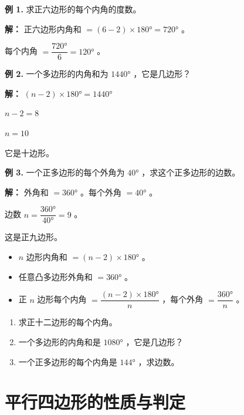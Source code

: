 \begin{workedexamples}


\textbf{例 1.} 求正六边形的每个内角的度数。

\textbf{解：}
正六边形内角和 $= (6 - 2) \times 180° = 720°$ 。

每个内角 $= \dfrac{720°}{6} = 120°$ 。

\textbf{例 2.} 一个多边形的内角和为 $1440°$ ，它是几边形？

\textbf{解：}
$(n - 2) \times 180° = 1440°$

$n - 2 = 8$

$n = 10$

它是十边形。

\textbf{例 3.} 一个正多边形的每个外角为 $40°$ ，求这个正多边形的边数。

\textbf{解：}
外角和 $= 360°$ 。每个外角 $= 40°$ 。

边数 $n = \dfrac{360°}{40°} = 9$ 。

这是正九边形。

\end{workedexamples}

\begin{keytakeaway}


\begin{itemize}
  \item $n$ 边形内角和 $= (n-2) \times 180°$ 。
  \item 任意凸多边形外角和 $= 360°$ 。
  \item 正 $n$ 边形每个内角 $= \dfrac{(n-2) \times 180°}{n}$ ，每个外角 $= \dfrac{360°}{n}$ 。
\end{itemize}


\end{keytakeaway}

\begin{practice}


\begin{enumerate}
  \item 求正十二边形的每个内角。
  \item 一个多边形的内角和是 $1080°$ ，它是几边形？
  \item 一个正多边形的每个内角是 $144°$ ，求边数。
\end{enumerate}


\end{practice}



\section*{平行四边形的性质与判定}


